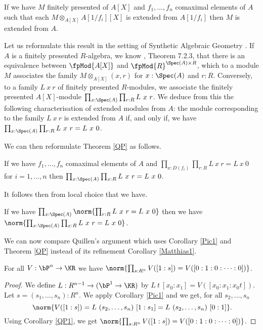 \begin{theorem}\label{QP}
  If we have $M$ finitely presented of $A[X]$ and $f_1,\dots,f_n$ comaximal elements of $A$
  such that each $M\otimes_{A[X]} A[1/f_i][X]$ is extended from $A[1/f_i]$ then $M$ is extended from $A$.
\end{theorem}

Let us reformulate this result in the setting of Synthetic Algebraic Geometry \cite{draft}.
If $A$ is a finitely presented $R$-algebra, we know \cite{draft}, Theorem 7.2.3, that there is an
equivalence between $\fpMod{A[X]}$ and ${\fpMod{R}}^{\Spec(A)\times R}$, which to a module $M$
associates the family $M\otimes_{A[X]} (x,r)$ for $x:\Spec(A)$ and $r:R$. Conversely, to a family $L~x~r$
of finitely presented $R$-modules, we associate the finitely presented $A[X]$-module $\prod_{x:\Spec(A)}\prod_{r:R}L~x~r$.
We deduce from this the following characterisation of extended modules from $A$: the module corresponding to the
family $L~x~r$ is extended from $A$ if, and only if, we have $\prod_{x:\Spec(A)}\prod_{r:R}L~x~r = L~x~0$.

We can then reformulate Theorem \ref{QP} as follows.

\begin{corollary}
  If we have $f_1,\dots,f_n$ comaximal elements of $A$ and $\prod_{x:D(f_i)}\prod_{r:R}L~x~r = L~x~0$ for $i=1,\dots, n$
  then $\prod_{x:\Spec(A)}\prod_{x:R}L~x~r = L~x~0$.
\end{corollary}

It follows then from local choice that we have.

\begin{corollary}\label{QP1}
  If we have $\prod_{x:\Spec(A)}\norm{\prod_{r:R}L~x~r = L~x~0}$ then we have $\norm{\prod_{x:\Spec(A)}\prod_{x:R}L~x~r = L~x~0}$.
\end{corollary}

We can now compare Quillen's argument which uses Corollary \ref{Pic1} and Theorem \ref{QP}
instead of its refinement Corollary \ref{Matthias1}.

\begin{proposition}\label{trivial}
  For all $V:\bP^n\rightarrow \KR$ we have $\norm{\prod_{s:R^n}V([1:s]) = V([0:1:0:\cdots :0])}$.
\end{proposition}

\begin{proof}
  We define $L:R^{n-1}\rightarrow (\bP^1 \to \KR)$ by $L~t~[x_0:x_1] = V([x_0:x_1:x_0t])$.
  Let $s=(s_1,\dots,s_{n}):R^{n}$. We apply Corollary \ref{Pic1} and we get, for all $s_2,\dots,s_n$
  \[
   \norm{V([1:s]) = L~(s_2,\dots,s_n)~[1:s_1] = L~(s_2,\dots,s_n)~[0:1]}
   \rlap{.}
   \]
   Using Corollary \ref{QP1}, we get $\norm{\prod_{s:R^n}V([1:s]) = V([0:1:0:\cdots :0])}$.
\end{proof}








